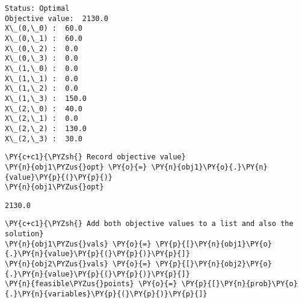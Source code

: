     \begin{Verbatim}[commandchars=\\\{\}]
Status: Optimal
Objective value:  2130.0
X\_(0,\_0) :  60.0
X\_(0,\_1) :  60.0
X\_(0,\_2) :  0.0
X\_(0,\_3) :  0.0
X\_(1,\_0) :  0.0
X\_(1,\_1) :  0.0
X\_(1,\_2) :  0.0
X\_(1,\_3) :  150.0
X\_(2,\_0) :  40.0
X\_(2,\_1) :  0.0
X\_(2,\_2) :  130.0
X\_(2,\_3) :  30.0
    \end{Verbatim}

    \begin{tcolorbox}[breakable, size=fbox, boxrule=1pt, pad at break*=1mm,colback=cellbackground, colframe=cellborder]
\begin{Verbatim}[commandchars=\\\{\}]
\PY{c+c1}{\PYZsh{} Record objective value}
\PY{n}{obj1\PYZus{}opt} \PY{o}{=} \PY{n}{obj1}\PY{o}{.}\PY{n}{value}\PY{p}{(}\PY{p}{)}
\PY{n}{obj1\PYZus{}opt}
\end{Verbatim}
\end{tcolorbox}

            \begin{tcolorbox}[breakable, size=fbox, boxrule=.5pt, pad at break*=1mm, opacityfill=0]
\begin{Verbatim}[commandchars=\\\{\}]
2130.0
\end{Verbatim}
\end{tcolorbox}
        
    \begin{tcolorbox}[breakable, size=fbox, boxrule=1pt, pad at break*=1mm,colback=cellbackground, colframe=cellborder]
\begin{Verbatim}[commandchars=\\\{\}]
\PY{c+c1}{\PYZsh{} Add both objective values to a list and also the solution}
\PY{n}{obj1\PYZus{}vals} \PY{o}{=} \PY{p}{[}\PY{n}{obj1}\PY{o}{.}\PY{n}{value}\PY{p}{(}\PY{p}{)}\PY{p}{]}
\PY{n}{obj2\PYZus{}vals} \PY{o}{=} \PY{p}{[}\PY{n}{obj2}\PY{o}{.}\PY{n}{value}\PY{p}{(}\PY{p}{)}\PY{p}{]}
\PY{n}{feasible\PYZus{}points} \PY{o}{=} \PY{p}{[}\PY{n}{prob}\PY{o}{.}\PY{n}{variables}\PY{p}{(}\PY{p}{)}\PY{p}{]}
\end{Verbatim}
\end{tcolorbox}

    \begin{tcolorbox}[breakable, size=fbox, boxrule=1pt, pad at break*=1mm,colback=cellbackground, colframe=cellborder]
\begin{Verbatim}[commandchars=\\\{\}]

\end{Verbatim}
\end{tcolorbox}

